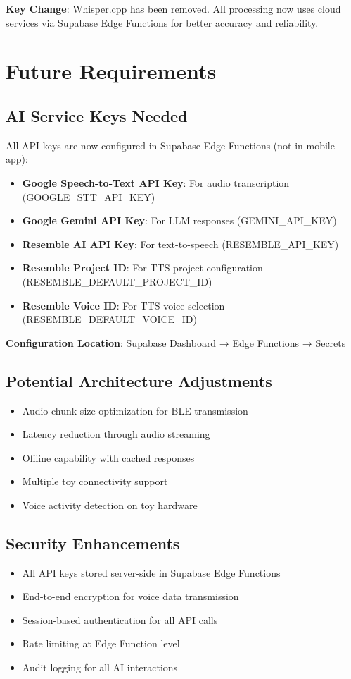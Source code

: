 \documentclass[11pt,a4paper]{article}
\begin{document}
\textbf{Key Change}: Whisper.cpp has been removed. All processing now uses cloud services via Supabase Edge Functions for better accuracy and reliability.

\section{Future Requirements}

\subsection{AI Service Keys Needed}
All API keys are now configured in Supabase Edge Functions (not in mobile app):
\begin{itemize}
    \item \textbf{Google Speech-to-Text API Key}: For audio transcription (GOOGLE\_STT\_API\_KEY)
    \item \textbf{Google Gemini API Key}: For LLM responses (GEMINI\_API\_KEY)
    \item \textbf{Resemble AI API Key}: For text-to-speech (RESEMBLE\_API\_KEY)
    \item \textbf{Resemble Project ID}: For TTS project configuration (RESEMBLE\_DEFAULT\_PROJECT\_ID)
    \item \textbf{Resemble Voice ID}: For TTS voice selection (RESEMBLE\_DEFAULT\_VOICE\_ID)
\end{itemize}

\textbf{Configuration Location}: Supabase Dashboard → Edge Functions → Secrets

\subsection{Potential Architecture Adjustments}
\begin{itemize}
    \item Audio chunk size optimization for BLE transmission
    \item Latency reduction through audio streaming
    \item Offline capability with cached responses
    \item Multiple toy connectivity support
    \item Voice activity detection on toy hardware
\end{itemize}

\subsection{Security Enhancements}
\begin{itemize}
    \item All API keys stored server-side in Supabase Edge Functions
    \item End-to-end encryption for voice data transmission
    \item Session-based authentication for all API calls
    \item Rate limiting at Edge Function level
    \item Audit logging for all AI interactions
\end{itemize}
\end{document}
